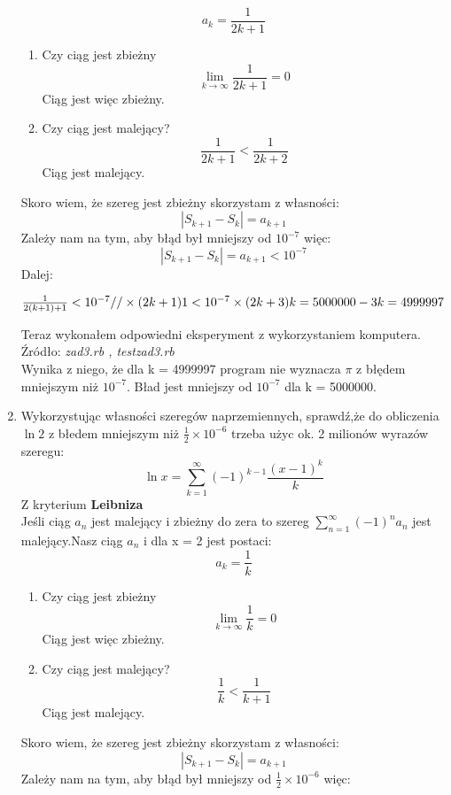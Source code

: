 \documentclass[fleqn]{article}
\begin{document}
\begin{enumerate}
  \[a_{k}=\frac{1}{2k+1}\]
   \begin{enumerate}
   \item Czy ciąg jest zbieżny
   \[\lim_{k \rightarrow \infty}\frac{1}{2k+1} = 0\]
   Ciąg jest więc zbieżny.
   \item Czy ciąg jest malejący?
   \[\frac{1}{2k+1} < \frac{1}{2k+2}\]
   Ciąg jest malejący.
   \end{enumerate}
   Skoro wiem, że szereg jest zbieżny skorzystam z własności:
   \[|S_{k+1} - S_{k}| = a_{k+1}\]
   Zależy nam na tym, aby błąd był mniejszy od $10^{-7}$ więc:
   \[|S_{k+1} - S_{k}| = a_{k+1} < 10^{-7}\]
   Dalej:\\
   \begin{center}
   $
   \frac{1}{2(k+1)+1} <10^{-7} //\times(2k+1)  \newline
   1 <10^{-7}\times(2k+3) \newline
   k = 5000000 - 3 \newline 
   k = 4999997\newline\newline
   $ \end{center}
    Teraz wykonałem odpowiedni eksperyment z wykorzystaniem komputera.\\
    Źródło: \emph{zad3.rb , testzad3.rb} \\
    Wynika z niego, że dla k = 4999997 program nie wyznacza $\pi$ z błędem mniejszym niż $ 10^{-7} $. Bład jest mniejszy od $ 10^{-7} $ dla k = 5000000.
  \item Wykorzystując własności szeregów naprzemiennych, sprawdź,że do obliczenia $ \ln2 $ z błedem mniejszym niż
  $\frac{1}{2}\times 10^{-6} $ trzeba użyc ok. 2 milionów wyrazów szeregu:\\
  \[\ln x = \sum_{k=1}^\infty(-1)^{k-1}\frac{(x-1)^k}{k}\]
   Z kryterium \textbf{Leibniza}\\
   Jeśli ciąg $a_{n}$ jest malejący i zbieżny do zera to szereg $\sum_{n=1}^\infty(-1)^{n}a_{n}$ jest malejący.Nasz ciąg $a_{n}$ i dla x = 2 jest postaci:
   \[a_{k} = \frac{1}{k}\]
    \begin{enumerate}
   \item Czy ciąg jest zbieżny
   \[\lim_{k \rightarrow \infty}\frac{1}{k} = 0\]
   Ciąg jest więc zbieżny.
   \item Czy ciąg jest malejący?
   \[\frac{1}{k} < \frac{1}{k+1}\]
   Ciąg jest malejący.
   \end{enumerate}
     Skoro wiem, że szereg jest zbieżny skorzystam z własności:
   \[|S_{k+1} - S_{k}| = a_{k+1}\]
    Zależy nam na tym, aby błąd był mniejszy od $\frac{1}{2}\times 10^{-6}$ więc:

\end{enumerate}
\end{document}
